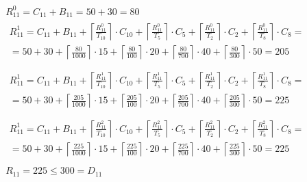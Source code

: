 \begin{gather*}
  R_{11}^0 = C_{11} + B_{11} = 50 + 30 = 80 \\
  \begin{multlined}
    R_{11}^1 = C_{11} + B_{11} + %
    \left\lceil\frac{R_{11}^0}{T_{10}}\right\rceil\cdot C_{10} + %
    \left\lceil\frac{R_{11}^0}{T_5}\right\rceil\cdot C_5 + %
    \left\lceil\frac{R_{11}^0}{T_2}\right\rceil\cdot C_2 + %
    \left\lceil\frac{R_{11}^0}{T_8}\right\rceil\cdot C_8 = \\%
    = 50 + 30 + \left\lceil\frac{80}{1000}\right\rceil\cdot 15 + %
    \left\lceil\frac{80}{100}\right\rceil\cdot 20 + %
    \left\lceil\frac{80}{700}\right\rceil\cdot 40 + %
    \left\lceil\frac{80}{300}\right\rceil\cdot 50 = 205 \\
  \end{multlined} \\
  \begin{multlined}
    R_{11}^1 = C_{11} + B_{11} + %
    \left\lceil\frac{R_{11}^1}{T_{10}}\right\rceil\cdot C_{10} + %
    \left\lceil\frac{R_{11}^1}{T_5}\right\rceil\cdot C_5 + %
    \left\lceil\frac{R_{11}^1}{T_2}\right\rceil\cdot C_2 + %
    \left\lceil\frac{R_{11}^1}{T_8}\right\rceil\cdot C_8 = \\%
    = 50 + 30 + \left\lceil\frac{205}{1000}\right\rceil\cdot 15 + %
    \left\lceil\frac{205}{100}\right\rceil\cdot 20 + %
    \left\lceil\frac{205}{700}\right\rceil\cdot 40 + %
    \left\lceil\frac{205}{300}\right\rceil\cdot 50 = 225 \\
  \end{multlined} \\
  \begin{multlined}
    R_{11}^1 = C_{11} + B_{11} + %
    \left\lceil\frac{R_{11}^2}{T_{10}}\right\rceil\cdot C_{10} + %
    \left\lceil\frac{R_{11}^2}{T_5}\right\rceil\cdot C_5 + %
    \left\lceil\frac{R_{11}^2}{T_2}\right\rceil\cdot C_2 + %
    \left\lceil\frac{R_{11}^2}{T_8}\right\rceil\cdot C_8 = \\%
    = 50 + 30 + \left\lceil\frac{225}{1000}\right\rceil\cdot 15 + %
    \left\lceil\frac{225}{100}\right\rceil\cdot 20 + %
    \left\lceil\frac{225}{700}\right\rceil\cdot 40 + %
    \left\lceil\frac{225}{300}\right\rceil\cdot 50 = 225 \\
  \end{multlined} \\
  R_{11} = 225 \le 300 = D_{11}
\end{gather*}

